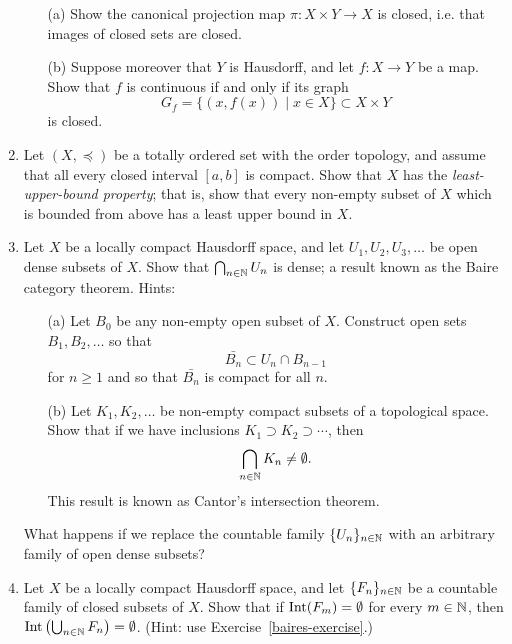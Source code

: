 \begin{enumerate}[label=3.\arabic*]
\begin{itemize}
      \item[(a)] Show the canonical projection map $\pi : X \times Y \to X$ is closed, i.e. that images of closed sets are closed.
      \item[(b)] Suppose moreover that $Y$ is Hausdorff, and let $f : X \to Y$ be a map. Show that $f$ is continuous if and only if its graph
        \[
          G_f = \{(x,f(x)) \mid x \in X\} \subset X \times Y
        \]
        is closed.
      \end{itemize}
    \item Let $(X,\preceq)$ be a totally ordered set with the order topology, and assume that all every closed interval $[a,b]$ is compact. Show that $X$ has the \emph{least-upper-bound property}; that is, show that every non-empty subset of $X$ which is bounded from above has a least upper bound in $X$.
    \item \label{baires-exercise} Let $X$ be a locally compact Hausdorff space, and let $U_1, U_2, U_3, \dots$ be open dense subsets of $X$. Show that $\bigcap_{n \in \mathbb{N}} U_n$ is dense; a result known as the Baire category theorem. Hints:
      \begin{itemize}
        \item[(a)] Let $B_0$ be any non-empty open subset of $X$. Construct open sets $B_1, B_2, \dots$ so that
          \[
            \bar{B_n} \subset U_n \cap B_{n-1}
          \]
          for $n \geq 1$ and so that $\bar{B_n}$ is compact for all $n$.
        \item[(b)] Let $K_1, K_2, \dots$ be non-empty compact subsets of a topological space. Show that if we have inclusions $K_1 \supset K_2 \supset \cdots$, then
          \[
            \bigcap_{n \in \mathbb{N}} K_n \not= \emptyset.
          \]
          This result is known as Cantor's intersection theorem.
      \end{itemize}
      What happens if we replace the countable family $\{U_n\}_{n \in \mathbb{N}}$ with an arbitrary family of open dense subsets?
    \item Let $X$ be a locally compact Hausdorff space, and let $\{F_n\}_{n \in \mathbb{N}}$ be a countable family of closed subsets of $X$. Show that if $\operatorname{Int}(F_m) = \emptyset$ for every $m \in \mathbb{N}$, then $\operatorname{Int}\left(\bigcup_{n \in \mathbb{N}} F_n\right) = \emptyset$. (Hint: use Exercise~\ref{baires-exercise}.)

\end{enumerate}
